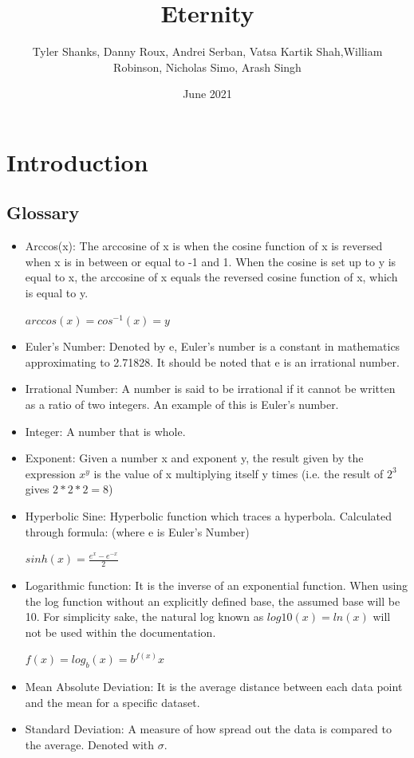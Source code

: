 \documentclass[titlepage]{article}
\title{Eternity}
\author{Tyler Shanks, Danny Roux, Andrei Serban, Vatsa Kartik Shah,\newpage William Robinson, Nicholas Simo, Arash Singh}
\date{June 2021}
\begin{document}



\fancyfoot{\thepage}

\tableofcontents
\newpage

\section{Introduction}
    \subsection{Glossary}
        \begin{itemize}
            \item Arccos(x): The arccosine of x is when the cosine function of x is reversed when x is in between or equal to -1 and 1. When the cosine is set up to y is equal to x, the arccosine of x equals the reversed cosine function of x, which is equal to y. \cite{arccos}
            \begin{center}
                $arccos(x) = cos^{-1}(x) = y$
            \end{center}
            \item Euler’s Number: Denoted by e, Euler’s number is a constant in mathematics approximating to 2.71828. It should be noted that e is an irrational number.\cite{boundless}
            \item Irrational Number: A number is said to be irrational if it cannot be written as a ratio of two integers. An example of this is Euler’s number. \cite{wolfram}
            \item Integer: A number that is whole. \cite{merriam}
            \item Exponent: Given a number x and exponent y, the result given by the expression $x^y$ is the value of x multiplying itself y times (i.e. the result of $2^3$ gives $2 * 2 * 2 = 8$)
            \item Hyperbolic Sine: Hyperbolic function which traces a hyperbola. Calculated through formula: (where e is Euler’s Number) \cite{encyclopaedia}
            \begin{center}
                $sinh(x) =  \frac{e^x - e^{-x}} {2}$ 
            \end{center}
            \item Logarithmic function: It is the inverse of an exponential function. When using the log function without an explicitly defined base, the assumed base will be 10. For simplicity sake, the natural log known as $log10(x) = ln(x)$ will not be used within the documentation.\cite{dawkins}
            \begin{center}
                $f(x) = log_b(x) = b^{f(x)}x$ 
            \end{center}
            \item  Mean Absolute Deviation: It is the average distance between each data point and the mean for a specific dataset. \cite{khan}
            \item Standard Deviation: A measure of how spread out the data is compared to the average. Denoted with $\sigma$. \cite{students}
        \end{itemize}
        
\end{document}
